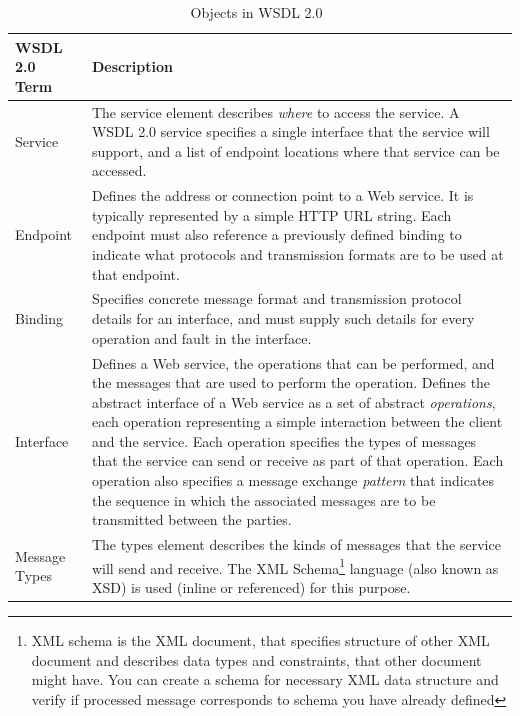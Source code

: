\begin{table}[h]
	\centering	
	\begin{tabular}[h]{|l|l|}
		\hline
		\textbf{WSDL 2.0 Term} & 
		\textbf{Description} 	
	    	\tabularnewline
		\hline
			Service &
			The service element describes \textit{where} to access the service. 
			A WSDL 2.0 service specifies a single interface that the service will support,
			and a list of endpoint locations where that service can be accessed.
			
			
	    	\tabularnewline	    	
	    	\hline
			Endpoint & 
			Defines the address or connection point to a Web service. 
			It is typically represented by a simple HTTP URL string.
			Each endpoint must also reference a previously defined binding to indicate 
			what protocols and transmission formats are to be used at that endpoint.
				
	    	\tabularnewline

	    	\hline
			Binding &		
			Specifies concrete message format and transmission protocol details for an interface, and must supply such details for every operation and fault in the interface.
	    	\tabularnewline

	    	\hline
			Interface &
			Defines a Web service, the operations that can be performed, and the messages that are used to perform the operation.
			Defines the abstract interface of a Web service as a set of abstract \textit{operations},
			each operation representing a simple interaction between the client and the service. 
			Each operation specifies the types of messages that the service can send or receive as part of that operation.
			Each operation also specifies a message exchange \textit{pattern} that indicates the sequence in which the associated messages are to be transmitted between the parties. 
	    	\tabularnewline

		\hline
			Message Types &
			The types element describes the kinds of messages that the service will send and receive.
			The XML Schema\footnote{XML schema is the XML document, that specifies structure of other XML document and describes data types and constraints,
			that other document might have. 
			You can create a schema for necessary XML data structure and verify if processed message corresponds to schema you have already defined}
			language (also known as XSD) is used (inline or referenced) for this purpose.
	    	\tabularnewline


		\hline
	  
	\end{tabular} 
	\caption{Objects in WSDL 2.0~\cite{wsdl_language_spec, wikipedia:WSDL} }
	\label{tbl:wdsl_members}
\end{table} 


